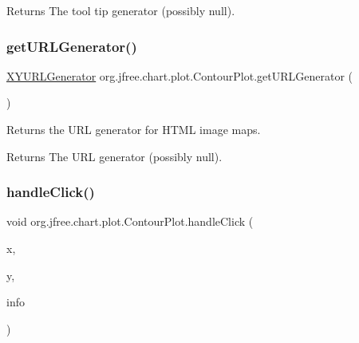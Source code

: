 \begin{DoxyReturn}{Returns}
The tool tip generator (possibly null). 
\end{DoxyReturn}
\mbox{\label{classorg_1_1jfree_1_1chart_1_1plot_1_1_contour_plot_ab0a93262786bfcdcaa8ae3269b09927e}} 
\subsubsection{\texorpdfstring{get\+U\+R\+L\+Generator()}{getURLGenerator()}}
{\footnotesize\ttfamily \mbox{\hyperlink{interfaceorg_1_1jfree_1_1chart_1_1urls_1_1_x_y_u_r_l_generator}{X\+Y\+U\+R\+L\+Generator}} org.\+jfree.\+chart.\+plot.\+Contour\+Plot.\+get\+U\+R\+L\+Generator (\begin{DoxyParamCaption}{ }\end{DoxyParamCaption})}

Returns the U\+RL generator for H\+T\+ML image maps.

\begin{DoxyReturn}{Returns}
The U\+RL generator (possibly null). 
\end{DoxyReturn}
\mbox{\label{classorg_1_1jfree_1_1chart_1_1plot_1_1_contour_plot_aed3e1bcd8ab24faf99eab43d048985fa}} 
\subsubsection{\texorpdfstring{handle\+Click()}{handleClick()}}
{\footnotesize\ttfamily void org.\+jfree.\+chart.\+plot.\+Contour\+Plot.\+handle\+Click (\begin{DoxyParamCaption}\item[{int}]{x,  }\item[{int}]{y,  }\item[{\mbox{\hyperlink{classorg_1_1jfree_1_1chart_1_1plot_1_1_plot_rendering_info}{Plot\+Rendering\+Info}}}]{info }\end{DoxyParamCaption})}

